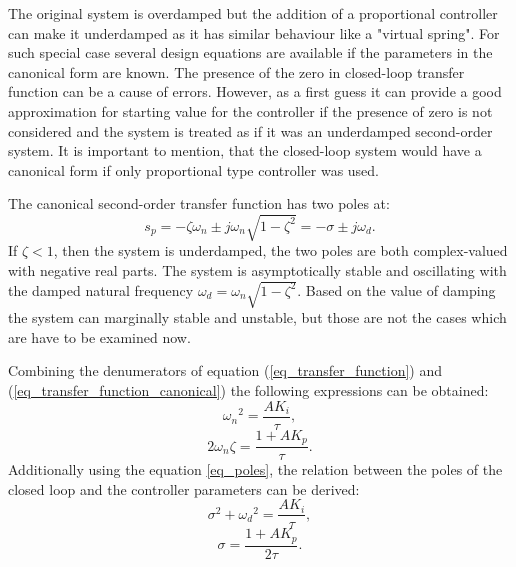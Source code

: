 \documentclass[12pt,english]{article}
\begin{document}
The original system is overdamped but the addition of a proportional controller can make it underdamped as it has similar behaviour like a "virtual spring". For such special case several design equations are available if the parameters in the canonical form are known. The presence of the zero in closed-loop transfer function can be a cause of errors. However, as a first guess it can provide a good approximation for starting value for the controller if the presence of zero is not considered and the system is treated as if it was an underdamped second-order system.
It is important to mention, that the closed-loop system would have a canonical form if only proportional type controller was used.

The canonical second-order transfer function has two poles at:
\begin{equation}
s_p = -\zeta \omega_n \pm j \omega_n \sqrt{1-{\zeta}^2} = -\sigma \pm j\omega_d.
\label{eq_poles}
\end{equation}
If $\zeta<1$, then the system is underdamped, the two poles are both complex-valued with negative real parts. The system is asymptotically stable and oscillating with the damped natural frequency $\omega_d = \omega_n \sqrt{1-{\zeta}^2}$. Based on the value of damping the system can marginally stable and unstable, but those are not the cases which are have to be examined now.

Combining the denumerators of equation (\ref{eq_transfer_function}) and (\ref{eq_transfer_function_canonical}) the following expressions can be obtained:
\begin{equation}
{\omega_n}^2 = \frac{A K_i}{\tau},
\end{equation}
\begin{equation}
2\omega_n\zeta  = \frac{1+A K_p}{\tau}.
\end{equation}
Additionally using the equation \ref{eq_poles}, the relation between the poles of the closed loop and the controller parameters can be derived:
\begin{equation}
\sigma^2 + {\omega_d}^2 = \frac{A K_i}{\tau},
\label{eq_pi_from_poles_1}
\end{equation}
\begin{equation}
\sigma = \frac{1+A K_p}{2\tau}.
\label{eq_pi_from_poles_2}
\end{equation}
\end{document}
